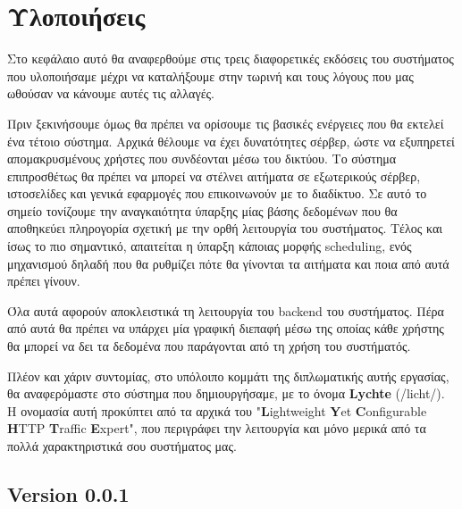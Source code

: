 \chapter{Υλοποιήσεις}
\label{chapter:implementations}

Στο κεφάλαιο αυτό θα αναφερθούμε στις τρεις διαφορετικές εκδόσεις του συστήματος που
υλοποιήσαμε μέχρι να καταλήξουμε στην τωρινή και τους λόγους που μας ωθούσαν να κάνουμε αυτές τις αλλαγές.

Πριν ξεκινήσουμε όμως θα πρέπει να ορίσουμε τις βασικές ενέργειες που θα εκτελεί ένα τέτοιο σύστημα.
Αρχικά θέλουμε να έχει δυνατότητες σέρβερ, ώστε να εξυπηρετεί απομακρυσμένους χρήστες που συνδέονται μέσω του δικτύου. 
Το σύστημα επιπροσθέτως θα πρέπει να μπορεί να στέλνει αιτήματα σε εξωτερικούς σέρβερ, ιστοσελίδες και γενικά 
εφαρμογές που επικοινωνούν με το διαδίκτυο. Σε αυτό το σημείο τονίζουμε την αναγκαιότητα ύπαρξης μίας βάσης δεδομένων που θα αποθηκεύει
πληρογορία σχετική με την ορθή λειτουργία του συστήματος. Τέλος και ίσως το πιο σημαντικό, απαιτείται η ύπαρξη κάποιας
μορφής scheduling, ενός μηχανισμού δηλαδή που θα ρυθμίζει πότε θα γίνονται τα αιτήματα και ποια από αυτά πρέπει γίνουν. 

Όλα αυτά αφορούν αποκλειστικά τη λειτουργία του backend του συστήματος. Πέρα από αυτά
θα πρέπει να υπάρχει μία γραφική διεπαφή μέσω της οποίας κάθε χρήστης θα μπορεί να δει τα δεδομένα που παράγονται
από τη χρήση του συστήματός.

Πλέον και χάριν συντομίας, στο υπόλοιπο κομμάτι της διπλωματικής αυτής εργασίας, θα αναφερόμαστε
στο σύστημα που δημιουργήσαμε, με το όνομα \textbf{Lychte} (/licht/). Η ονομασία αυτή προκύπτει από τα αρχικά του "\textbf{L}ightweight
\textbf{Y}et \textbf{C}onfigurable \textbf{H}ΤTP \textbf{T}raffic \textbf{E}xpert", που περιγράφει την λειτουργία και μόνο 
μερικά από τα πολλά χαρακτηριστικά σου συστήματος μας.  

\section{Version 0.0.1}
\label{section:first_implementation}



